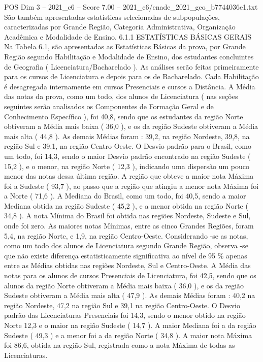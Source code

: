 \begin{textsample}{POS Dim 3 – 2021\_c6 – Score 7.00 – 2021\_c6/enade\_2021\_geo\_b7744036e1.txt}
São também apresentadas estatísticas selecionadas de subpopulações, caracterizadas por Grande Região, Categoria Administrativa, Organização Acadêmica e Modalidade de Ensino. 6.1.1 ESTATÍSTICAS BÁSICAS GERAIS Na Tabela 6.1, são apresentadas as Estatísticas Básicas da prova, por Grande Região segundo Habilitação e Modalidade de Ensino, dos estudantes concluintes de Geografia ( Licenciatura/Bacharelado ).
As análises serão feitas primeiramente para os cursos de Licenciatura e depois para os de Bacharelado.
Cada Habilitação é desagregada internamente em cursos Presenciais e cursos a Distância.
A Média das notas da prova, como um todo, dos alunos de Licenciatura ( nas seções seguintes serão analisados os Componentes de Formação Geral e de Conhecimento Específico ), foi 40,8, sendo que os estudantes da região Norte obtiveram a Média mais baixa ( 36,0 ), e os da região Sudeste obtiveram a Média mais alta ( 44,8 ).
As demais Médias foram : 39,2, na região Nordeste, 39,8, na região Sul e 39,1, na região Centro-Oeste.
O Desvio padrão para o Brasil, como um todo, foi 14,3, sendo o maior Desvio padrão encontrado na região Sudeste ( 15,2 ), e o menor, na região Norte ( 12,3 ), indicando uma dispersão um pouco menor das notas dessa última região.
A região que obteve a maior nota Máxima foi a Sudeste ( 93,7 ), ao passo que a região que atingiu a menor nota Máxima foi a Norte ( 71,6 ).
A Mediana do Brasil, como um todo, foi 40,5, sendo a maior Mediana obtida na região Sudeste ( 45,2 ), e a menor obtida na região Norte ( 34,8 ).
A nota Mínima do Brasil foi obtida nas regiões Nordeste, Sudeste e Sul, onde foi zero.
As maiores notas Mínimas, entre as cinco Grandes Regiões, foram 5,4, na região Norte, e 1,9, na região Centro-Oeste.
Considerando -se as notas, como um todo dos alunos de Licenciatura segundo Grande Região, observa -se que não existe diferença estatisticamente significativa ao nível de 95 \% apenas entre as Médias obtidas nas regiões Nordeste, Sul e Centro-Oeste.
A Média das notas para os alunos de cursos Presenciais de Licenciatura, foi 42,5, sendo que os alunos da região Norte obtiveram a Média mais baixa ( 36,0 ), e os da região Sudeste obtiveram a Média mais alta ( 47,9 ).
As demais Médias foram : 40,2 na região Nordeste, 47,2 na região Sul e 39,1 na região Centro-Oeste.
O Desvio padrão das Licenciaturas Presenciais foi 14,3, sendo o menor obtido na região Norte 12,3 e o maior na região Sudeste ( 14,7 ).
A maior Mediana foi a da região Sudeste ( 49,3 ) e a menor foi a da região Norte ( 34,8 ).
A maior nota Máxima foi 86,6, obtida na região Sul, registrada como a nota Máxima de todas as Licenciaturas.

\end{textsample}

